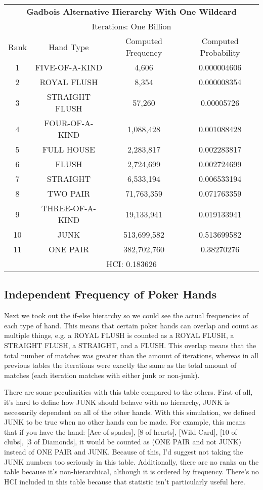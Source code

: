 \documentclass[16pt]{article}
\begin{document}
\begin{center}
\begin{tabular}{ |c c c c|} 
\hline
\multicolumn{4}{|c|}{\textbf{Gadbois Alternative Hierarchy With One Wildcard}} \\
\multicolumn{4}{|c|}{Iterations: One Billion} \\
 \hline
 Rank & Hand Type & Computed Frequency & Computed Probability \\ 
 \hline
 1 & FIVE-OF-A-KIND & 4,606 & 0.000004606\\ 
 2 & ROYAL FLUSH & 8,354 & 0.000008354\\ 
 3 & STRAIGHT FLUSH & 57,260 & 0.00005726\\
 4 & FOUR-OF-A-KIND & 1,088,428 & 0.001088428\\
 5 & FULL HOUSE & 2,283,817 & 0.002283817\\
 6 & FLUSH & 2,724,699 & 0.002724699\\
 7 & STRAIGHT & 6,533,194 & 0.006533194\\
 8 & TWO PAIR & 71,763,359 & 0.071763359\\
 9 & THREE-OF-A-KIND & 19,133,941 & 0.019133941\\
 10 & JUNK & 513,699,582 & 0.513699582\\
 11 & ONE PAIR & 382,702,760 & 0.38270276\\
 \hline
 \multicolumn{4}{|c|}{HCI: 0.183626} \\
 \hline
\end{tabular}
\end{center}

\subsection{\textbf{Independent Frequency of Poker Hands}}
Next we took out the if-else hierarchy so we could see the actual frequencies of each type of hand. This means that certain poker hands can overlap and count as multiple things, e.g. a ROYAL FLUSH is counted as a ROYAL FLUSH, a STRAIGHT FLUSH, a STRAIGHT, and a FLUSH. This overlap means that the total number of matches was greater than the amount of iterations, whereas in all previous tables the iterations were exactly the same as the total amount of matches (each iteration matches with either junk or non-junk).

There are some peculiarities with this table compared to the others. First of all, it's hard to define how JUNK should behave with no hierarchy, JUNK is necessarily dependent on all of the other hands. With this simulation, we defined JUNK to be true when no other hands can be made. For example, this means that if you have the hand: [Ace of spades], [8 of hearts], [Wild Card], [10 of clubs], [3 of Diamonds], it would be counted as (ONE PAIR and not JUNK) instead of ONE PAIR and JUNK. Because of this, I'd suggest not taking the JUNK numbers too seriously in this table. Additionally, there are no ranks on the table because it's non-hierarchical, although it is ordered by frequency. There's no HCI included in this table because that statistic isn't particularly useful here.
\end{document}
